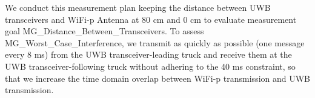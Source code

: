 \begin{table}[]
    \centering
    \caption{Configurations for measurement plan MP\_Interference}
    \label{configurationsMPInterference}
    
\end{table}

We conduct this measurement plan keeping the distance between UWB transceivers and WiFi-p Antenna at 80 cm and 0 cm to evaluate measurement goal MG\_Distance\_Between\_Transceivers. To assess MG\_Worst\_Case\_Interference, we transmit as quickly as possible (one message every 8 ms) from the UWB transceiver-leading truck and receive them at the UWB transceiver-following truck without adhering to the 40 ms constraint, so that we increase the time domain overlap between WiFi-p transmission and UWB transmission. 

